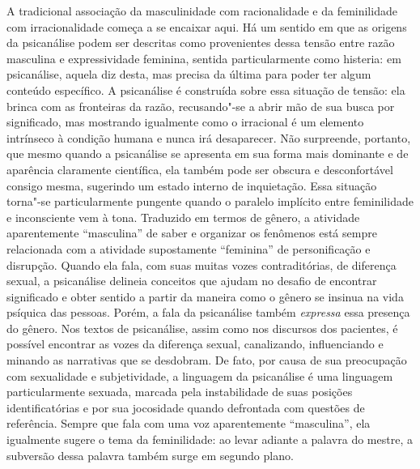 A tradicional associação da masculinidade com racionalidade e da
feminilidade com irracionalidade começa a se encaixar aqui. Há um
sentido em que as origens da psicanálise podem ser descritas como
provenientes dessa tensão entre razão masculina e expressividade
feminina, sentida particularmente como histeria: em psicanálise, aquela
diz desta, mas precisa da última para poder ter algum conteúdo
específico. A psicanálise é construída sobre essa situação de tensão:
ela brinca com as fronteiras da razão, recusando"-se a abrir mão de sua
busca por significado, mas mostrando igualmente como o irracional é um
elemento intrínseco à condição humana e nunca irá desaparecer. Não
surpreende, portanto, que mesmo quando a psicanálise se apresenta em sua
forma mais dominante e de aparência claramente científica, ela também
pode ser obscura e desconfortável consigo mesma, sugerindo um estado
interno de inquietação. Essa situação torna"-se particularmente pungente
quando o paralelo implícito entre feminilidade e inconsciente vem à
tona. Traduzido em termos de gênero, a atividade aparentemente
``masculina'' de saber e organizar os fenômenos está sempre relacionada
com a atividade supostamente ``feminina'' de personificação e disrupção.
Quando ela fala, com suas muitas vozes contraditórias, de diferença
sexual, a psicanálise delineia conceitos que ajudam no desafio de
encontrar significado e obter sentido a partir da maneira como o gênero
se insinua na vida psíquica das pessoas. Porém, a fala da psicanálise
também \emph{expressa} essa presença do gênero. Nos textos de
psicanálise, assim como nos discursos dos pacientes, é possível
encontrar as vozes da diferença sexual, canalizando, influenciando e
minando as narrativas que se desdobram. De fato, por causa de sua
preocupação com sexualidade e subjetividade, a linguagem da psicanálise
é uma linguagem particularmente sexuada, marcada pela instabilidade de
suas posições identificatórias e por sua jocosidade quando defrontada
com questões de referência. Sempre que fala com uma voz aparentemente
``masculina'', ela igualmente sugere o tema da feminilidade: ao levar
adiante a palavra do mestre, a subversão dessa palavra também surge em
segundo plano.

